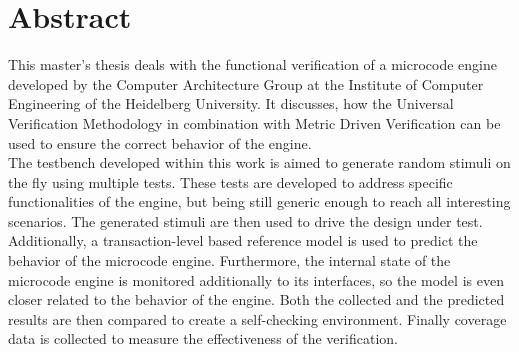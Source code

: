 \section*{Abstract}

This master's thesis deals with the functional verification of a microcode engine developed by the Computer Architecture Group at the Institute of Computer
Engineering of the Heidelberg University.
It discusses, how the Universal Verification Methodology in combination with Metric Driven Verification can be used to ensure the correct behavior of the
engine. \\
The testbench developed within this work is aimed to generate random stimuli on the fly using multiple tests. 
These tests are developed to address specific functionalities of the engine, but being still generic enough to reach all interesting scenarios. 
The generated stimuli are then used to drive the design under test. \\
Additionally, a transaction-level based reference model is used to predict the behavior of the microcode engine. 
Furthermore, the internal state of the microcode engine is monitored additionally to its interfaces, so the model is even closer related to the behavior of the engine.
Both the collected and the predicted results are then compared to create a self-checking environment.
Finally coverage data is collected to measure the effectiveness of the verification.
